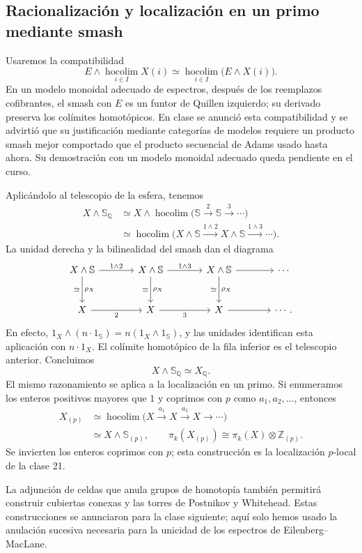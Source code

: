 \subsection{Racionalización y localización en un primo mediante smash}
Usaremos la compatibilidad
\[
E\wedge\operatorname*{hocolim}_{i\in I}X(i)
\simeq\operatorname*{hocolim}_{i\in I}\bigl(E\wedge X(i)\bigr).
\]
En un modelo monoidal adecuado de espectros, después de los reemplazos cofibrantes, el smash con $E$ es un funtor de Quillen izquierdo; su derivado preserva los colímites homotópicos. En clase se anunció esta compatibilidad y se advirtió que su justificación mediante categorías de modelos requiere un producto smash mejor comportado que el producto secuencial de Adams usado hasta ahora. Su demostración con un modelo monoidal adecuado queda pendiente en el curso.

Aplicándolo al telescopio de la esfera, tenemos
\[
\begin{aligned}
X\wedge\mathbb S_{\mathbb Q}
&\simeq X\wedge\operatorname*{hocolim}
\bigl(\mathbb S\xrightarrow{2}\mathbb S\xrightarrow{3}\cdots\bigr)\\
&\simeq\operatorname*{hocolim}
\bigl(X\wedge\mathbb S\xrightarrow{1\wedge2}X\wedge\mathbb S
\xrightarrow{1\wedge3}\cdots\bigr).
\end{aligned}
\]
La unidad derecha y la bilinealidad del smash dan el diagrama
\[
\begin{tikzcd}[column sep=large,row sep=large]
X\wedge\mathbb S\arrow[r,"1\wedge2"]\arrow[d,"\rho_X","\simeq"']
&X\wedge\mathbb S\arrow[r,"1\wedge3"]\arrow[d,"\rho_X","\simeq"']
&X\wedge\mathbb S\arrow[r]\arrow[d,"\rho_X","\simeq"']&\cdots\\
X\arrow[r,"2"']&X\arrow[r,"3"']&X\arrow[r]&\cdots.
\end{tikzcd}
\]
En efecto, $1_X\wedge(n\cdot1_{\mathbb S})=n(1_X\wedge1_{\mathbb S})$, y las unidades identifican esta aplicación con $n\cdot1_X$. El colímite homotópico de la fila inferior es el telescopio anterior. Concluimos
\[
X\wedge\mathbb S_{\mathbb Q}\simeq X_{\mathbb Q}.
\]
El mismo razonamiento se aplica a la localización en un primo. Si enumeramos los enteros positivos mayores que $1$ y coprimos con $p$ como $a_1,a_2,\ldots$, entonces
\[
\begin{aligned}
X_{(p)}
&\simeq\operatorname*{hocolim}
\bigl(X\xrightarrow{a_1}X\xrightarrow{a_2}X\longrightarrow\cdots\bigr)\\
&\simeq X\wedge\mathbb S_{(p)},
\qquad\pi_k(X_{(p)})\cong\pi_k(X)\otimes\mathbb Z_{(p)}.
\end{aligned}
\]
Se invierten los enteros coprimos con $p$; esta construcción es la localización $p$-local de la clase 21.

La adjunción de celdas que anula grupos de homotopía también permitirá construir cubiertas conexas y las torres de Postnikov y Whitehead. Estas construcciones se anunciaron para la clase siguiente; aquí solo hemos usado la anulación sucesiva necesaria para la unicidad de los espectros de Eilenberg--MacLane.
